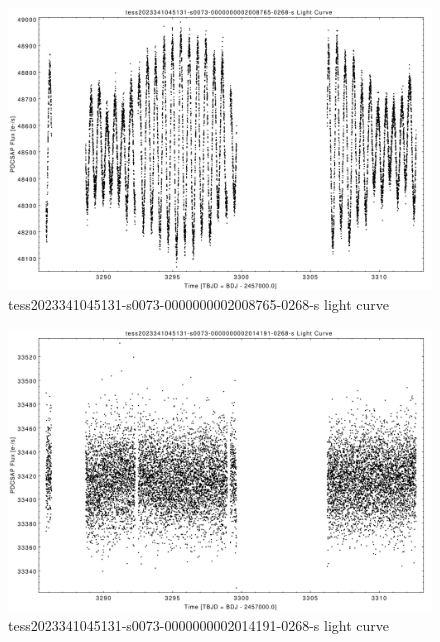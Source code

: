 \documentclass[a4paper,12pt]{article}
\begin{document}
\begin{figure}[htbp]
    \centering
    \includegraphics[width = 1\textwidth]{
      lightcurves/tess2023341045131-s0073-0000000002008765-0268-s.pdf}
    \caption{tess2023341045131-s0073-0000000002008765-0268-s light curve}
\end{figure}
\begin{figure}[htbp]
    \centering
    \includegraphics[width = 1\textwidth]{
      lightcurves/tess2023341045131-s0073-0000000002014191-0268-s.pdf}
    \caption{tess2023341045131-s0073-0000000002014191-0268-s light curve}
\end{figure}
\end{document}
